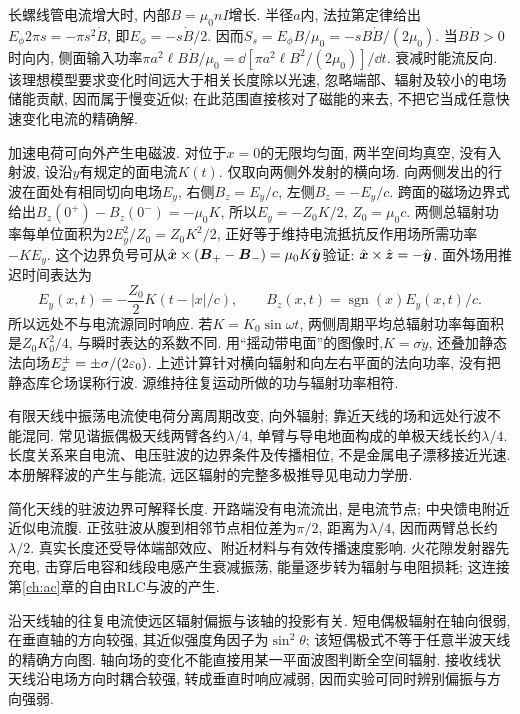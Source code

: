 长螺线管电流增大时, 内部$B=\mu_0nI$增长. 半径$a$内, 法拉第定律给出$E_\phi2\pi s=-\pi s^2\dot B$, 即$E_\phi=-s\dot B/2$. 因而$S_s=E_\phi B/\mu_0=-sB\dot B/(2\mu_0)$. 当$B\dot B>0$时向内, 侧面输入功率$\pi a^2\ell B\dot B/\mu_0=\dd[\pi a^2\ell B^2/(2\mu_0)]/\dd t$. 衰减时能流反向. 该理想模型要求变化时间远大于相关长度除以光速, 忽略端部、辐射及较小的电场储能贡献, 因而属于慢变近似; 在此范围直接核对了磁能的来去, 不把它当成任意快速变化电流的精确解.

加速电荷可向外产生电磁波. 对位于$x=0$的无限均匀面, 两半空间均真空, 没有入射波, 设沿$y$有规定的面电流$K(t)$. 仅取向两侧外发射的横向场. 向两侧发出的行波在面处有相同切向电场$E_y$, 右侧$B_z=E_y/c$, 左侧$B_z=-E_y/c$. 跨面的磁场边界式给出$B_z(0^+)-B_z(0^-)=-\mu_0K$, 所以$E_y=-Z_0K/2$, $Z_0=\mu_0c$. 两侧总辐射功率每单位面积为$2E_y^2/Z_0=Z_0K^2/2$, 正好等于维持电流抵抗反作用场所需功率$-KE_y$. 这个边界负号可从$\hat{\boldsymbol{x}}\times(\boldsymbol{B}_+-\boldsymbol{B}_-)=\mu_0K\hat{\boldsymbol{y}}$验证: $\hat{\boldsymbol{x}}\times\hat{\boldsymbol{z}}=-\hat{\boldsymbol{y}}$. 面外场用推迟时间表达为
\[
E_y(x,t)=-\frac{Z_0}2K(t-|x|/c),\qquad
B_z(x,t)=\operatorname{sgn}(x)E_y(x,t)/c.
\]
所以远处不与电流源同时响应. 若$K=K_0\sin\omega t$, 两侧周期平均总辐射功率每面积是$Z_0K_0^2/4$, 与瞬时表达的系数不同. 用“摇动带电面”的图像时,$K=\sigma\dot y$, 还叠加静态法向场$E_x^\pm=\pm\sigma/(2\varepsilon_0)$. 上述计算针对横向辐射和向左右平面的法向功率, 没有把静态库仑场误称行波. 源维持往复运动所做的功与辐射功率相符.

有限天线中振荡电流使电荷分离周期改变, 向外辐射; 靠近天线的场和远处行波不能混同. 常见谐振偶极天线两臂各约$\lambda/4$, 单臂与导电地面构成的单极天线长约$\lambda/4$. 长度关系来自电流、电压驻波的边界条件及传播相位, 不是金属电子漂移接近光速. 本册解释波的产生与能流, 远区辐射的完整多极推导见电动力学册.


简化天线的驻波边界可解释长度. 开路端没有电流流出, 是电流节点; 中央馈电附近近似电流腹. 正弦驻波从腹到相邻节点相位差为$\pi/2$, 距离为$\lambda/4$, 因而两臂总长约$\lambda/2$. 真实长度还受导体端部效应、附近材料与有效传播速度影响. 火花隙发射器先充电, 击穿后电容和线段电感产生衰减振荡, 能量逐步转为辐射与电阻损耗; 这连接第\ref{ch:ac}章的自由RLC与波的产生.

沿天线轴的往复电流使远区辐射偏振与该轴的投影有关. 短电偶极辐射在轴向很弱, 在垂直轴的方向较强, 其近似强度角因子为$\sin^2\theta$; 该短偶极式不等于任意半波天线的精确方向图. 轴向场的变化不能直接用某一平面波图判断全空间辐射. 接收线状天线沿电场方向时耦合较强, 转成垂直时响应减弱, 因而实验可同时辨别偏振与方向强弱.
